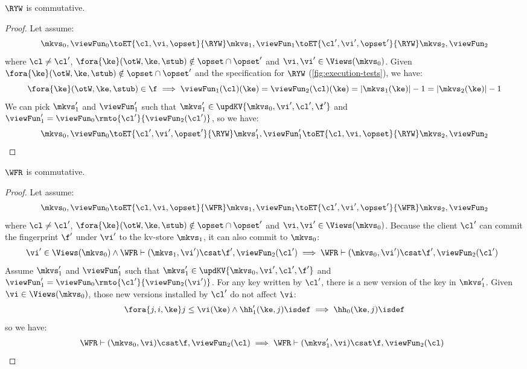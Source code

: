 \begin{lemma}
    \label{lem:ryw-comm}
    \(\RYW\) is commutative.
\end{lemma}
\begin{proof}
    Let assume:
    \[
        \mkvs_0, \viewFun_0 \toET{\cl, \vi, \opset}{\RYW} \mkvs_1, \viewFun_1 \toET{\cl', \vi', \opset'}{\RYW} \mkvs_2, \viewFun_2 
    \]
    where \( \cl \neq \cl' \), \( \fora{ \ke } (\otW, \ke, \stub) \notin \opset \cap \opset' \) and \( \vi, \vi' \in \Views(\mkvs_0)\).
    Given \( \fora{ \ke } (\otW, \ke, \stub) \notin \opset \cap \opset' \) and the specification for \( \RYW \) (\cref{fig:execution-tests}), we have:
    \[
        \fora{\ke} (\otW, \ke, \stub) \in \f \implies \viewFun_1(\cl)(\ke) = \viewFun_2(\cl)(\ke) = \lvert \mkvs_1(\ke) \rvert - 1 = \lvert \mkvs_2(\ke) \rvert - 1
    \]
    We can pick \( \mkvs'_1 \) and \( \viewFun'_1 \) such that \( \mkvs'_1 \in \updKV{\mkvs_0,\vi',\cl',\f'} \) and \( \viewFun'_1 = \viewFun_0\rmto{\cl'}{\viewFun_2(\cl')} \), so we have:
    \[
        \mkvs_0, \viewFun_0 \toET{\cl', \vi', \opset'}{\RYW} \mkvs'_1, \viewFun'_1 \toET{\cl, \vi, \opset}{\RYW} \mkvs_2, \viewFun_2 
    \]
\end{proof}

\begin{lemma}
    \label{lem:wfr-comm}
    \(\WFR\) is commutative.
\end{lemma}
\begin{proof}
    Let assume:
    \[
        \mkvs_0, \viewFun_0 \toET{\cl, \vi, \opset}{\WFR} \mkvs_1, \viewFun_1 \toET{\cl', \vi', \opset'}{\WFR} \mkvs_2, \viewFun_2 
    \]
    where \( \cl \neq \cl' \), \( \fora{ \ke } (\otW, \ke, \stub) \notin \opset \cap \opset' \) and \( \vi, \vi' \in \Views(\mkvs_0)\).
    Because the client \( \cl' \) can commit the fingerprint \( \f' \) under \( \vi' \) to the kv-store \( \mkvs_1 \), it can also commit to \( \mkvs_0 \):
    \[
        \begin{array}{@{}l}
            \vi' \in \Views(\mkvs_0) \land \WFR \vdash (\mkvs_1, \vi') \csat \f', \viewFun_2(\cl') \implies  \WFR \vdash (\mkvs_0, \vi') \csat \f', \viewFun_2(\cl')
        \end{array}
    \]
    Assume \( \mkvs'_1 \) and \( \viewFun'_1 \) such that \( \mkvs'_1 \in \updKV{\mkvs_0,\vi',\cl',\f'} \) and \( \viewFun'_1 = \viewFun_0\rmto{\cl'}{\viewFun_2(\vi')} \).
    For any key written by \( \cl' \), there is a new version of the key in \( \mkvs'_1 \).
    Given \( \vi \in \Views(\mkvs_0)\), those new versions installed by \( \cl' \) do not affect \( \vi \):
    \[
        \fora{j,i, \ke} j \leq \vi(\ke) \land \hh'_1(\ke, j)\isdef \implies \hh_0(\ke, j)\isdef
    \]
    so we have:
    \[
        \begin{array}{@{}l}
            \WFR \vdash (\mkvs_0, \vi) \csat \f, \viewFun_2(\cl) \implies \WFR \vdash (\mkvs'_1, \vi) \csat \f, \viewFun_2(\cl)
        \end{array}
    \]
\end{proof}

